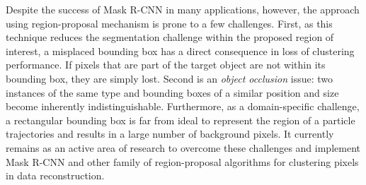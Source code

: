 \documentclass{ws-rv9x6}
\begin{document}
Despite the success of Mask R-CNN in many applications, however, the approach using region-proposal mechanism is prone to a few challenges. First, as this technique reduces the segmentation challenge within the proposed region of interest, a misplaced bounding box has a direct consequence in loss of clustering performance. If pixels that are part of the target object are  not within its bounding box, they are simply lost. Second is an {\it object occlusion} issue: two instances of the same type and bounding boxes of a similar position and size become inherently indistinguishable. Furthermore, as a domain-specific challenge, a rectangular bounding box is far from ideal to represent the region of a particle trajectories and results in a large number of background pixels. It currently remains as an active area of research to overcome these challenges and implement Mask R-CNN and other family of region-proposal algorithms for clustering pixels in data reconstruction.
\end{document}
